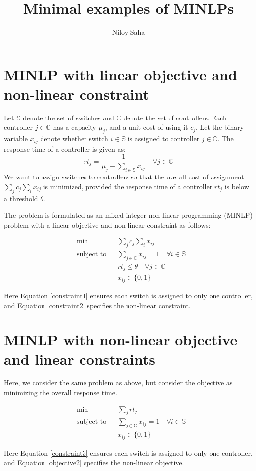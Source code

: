 \documentclass[12pt]{article}
\title{Minimal examples of MINLPs}
\author{Niloy Saha}
\date{}
\begin{document}
\maketitle

\section{MINLP with linear objective and non-linear constraint}
Let $\mathbb{S}$ denote the set of switches and $\mathbb{C}$ denote the set of controllers. Each controller $j \in \mathbb{C}$ has a capacity $\mu_j$, and a unit cost of using it $c_j$. Let the binary variable $x_{ij}$ denote whether switch $i \in \mathbb{S}$ is assigned to controller $j \in \mathbb{C}$. The response time of a controller is given as:
\begin{equation}
rt_j = \frac{1}{\mu_j - \sum_{i \in \mathbb{S}} x_{ij}} \quad \forall j \in \mathbb{C}
\end{equation}  We want to assign switches to controllers so that the overall cost of assignment $\sum_j c_j \sum_i x_{ij}$ is minimized, provided the response time of a controller $rt_j$ is below a threshold $\theta$.

The problem is formulated as an mixed integer non-linear programming (MINLP) problem with a linear objective and non-linear constraint as follows:

\begin{subequations}
\begin{align}
   & \min && \sum_j c_j \sum_i x_{ij} \label{objective1} \\
   & \text{subject to} && \sum_{j \in \mathbb{C}} x_{ij} = 1 \quad \forall i \in \mathbb{S} \label{constraint1} \\
   & && rt_j \leq \theta \quad \forall j \in \mathbb{C} \label{constraint2} \\
   & && x_{ij} \in \{0, 1\}
\end{align}
\end{subequations}

Here Equation \eqref{constraint1} ensures each switch is assigned to only one controller, and Equation \eqref{constraint2} specifies the non-linear constraint.

\section{MINLP with non-linear objective and linear constraints}
Here, we consider the same problem as above, but consider the objective as minimizing the overall response time.

\begin{subequations}
\begin{align}
   & \min && \sum_j rt_j \label{objective2} \\
   & \text{subject to} && \sum_{j \in \mathbb{C}} x_{ij} = 1 \quad \forall i \in \mathbb{S} \label{constraint3} \\
   & && x_{ij} \in \{0, 1\}
\end{align}
\end{subequations}

Here Equation \eqref{constraint3} ensures each switch is assigned to only one controller, and Equation \eqref{objective2} specifies the non-linear objective.
\end{document}
